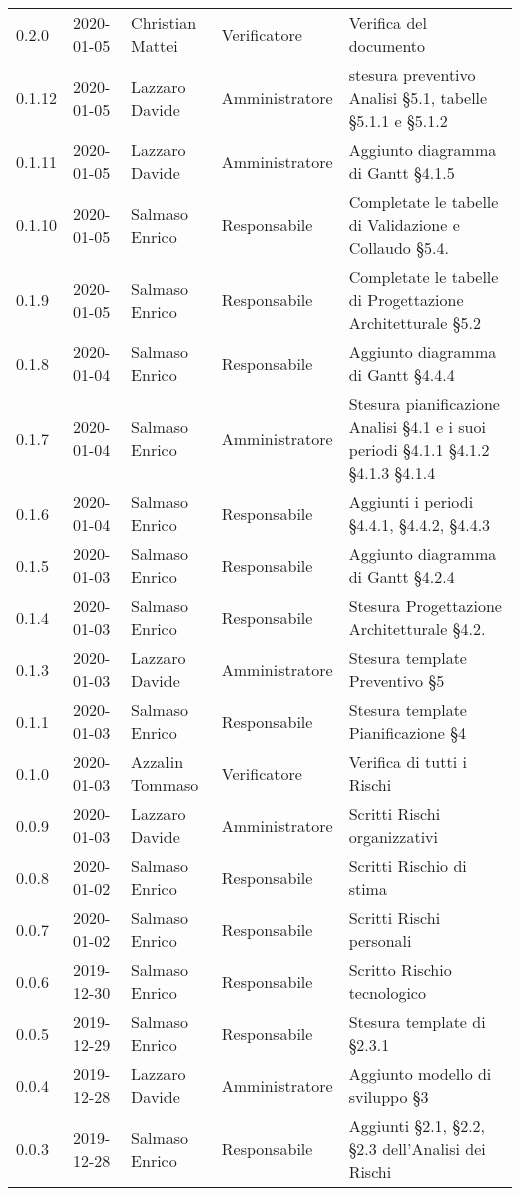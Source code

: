 {\begin{longtable}{C{2cm} C{2cm}  C{3cm}  C{3cm} C{4.5cm}}
0.2.0 & 2020-01-05 & Christian Mattei & Verificatore & Verifica del documento  \\
0.1.12 & 2020-01-05 & Lazzaro Davide & Amministratore & stesura preventivo Analisi §5.1, tabelle §5.1.1 e §5.1.2 \\
0.1.11 & 2020-01-05 & Lazzaro Davide & Amministratore & Aggiunto diagramma di Gantt §4.1.5 \\
0.1.10 & 2020-01-05 & Salmaso Enrico & Responsabile & Completate le tabelle di Validazione e Collaudo §5.4.\\
0.1.9 & 2020-01-05 & Salmaso Enrico & Responsabile & Completate le tabelle di Progettazione Architetturale §5.2\\
0.1.8 & 2020-01-04 & Salmaso Enrico & Responsabile & Aggiunto diagramma di Gantt §4.4.4 \\
0.1.7 & 2020-01-04 & Salmaso Enrico & Amministratore & Stesura pianificazione Analisi §4.1 e i suoi periodi §4.1.1 §4.1.2 §4.1.3 §4.1.4 \\
0.1.6 & 2020-01-04 & Salmaso Enrico & Responsabile & Aggiunti i periodi §4.4.1, §4.4.2, §4.4.3\\
0.1.5 & 2020-01-03 & Salmaso Enrico & Responsabile & Aggiunto diagramma di Gantt §4.2.4\\
0.1.4 & 2020-01-03 & Salmaso Enrico & Responsabile & Stesura Progettazione Architetturale §4.2.\\
0.1.3 & 2020-01-03 & Lazzaro Davide & Amministratore & Stesura template Preventivo §5\\
0.1.1 & 2020-01-03 & Salmaso Enrico & Responsabile & Stesura template Pianificazione §4\\
0.1.0 & 2020-01-03 & Azzalin Tommaso & Verificatore & Verifica di tutti i Rischi  \\
0.0.9 & 2020-01-03 & Lazzaro Davide & Amministratore & Scritti Rischi organizzativi \\
0.0.8 & 2020-01-02 & Salmaso Enrico & Responsabile & Scritti Rischio di stima \\
0.0.7 & 2020-01-02 & Salmaso Enrico & Responsabile & Scritti Rischi personali \\
0.0.6 & 2019-12-30 & Salmaso Enrico & Responsabile & Scritto Rischio tecnologico \\
0.0.5 & 2019-12-29 & Salmaso Enrico & Responsabile & Stesura template di §2.3.1\\
0.0.4 & 2019-12-28 & Lazzaro Davide & Amministratore & Aggiunto modello di sviluppo §3\\
0.0.3 & 2019-12-28 & Salmaso Enrico & Responsabile & Aggiunti §2.1, §2.2, §2.3 dell'Analisi dei Rischi \\

\end{longtable}}
